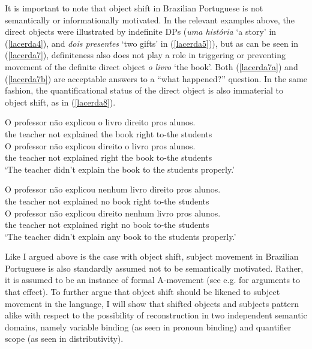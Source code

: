 \documentclass[output=paper]{langscibook}
\begin{document}
It is important to note that object shift in Brazilian Portuguese is not semantically or informationally motivated. In the relevant examples above, the direct objects were illustrated by indefinite DPs (\emph{uma história} ‘a story’ in (\ref{lacerda4}), and \emph{dois presentes} ‘two gifts’ in (\ref{lacerda5})), but as can be seen  in (\ref{lacerda7}), definiteness also does not play a role in triggering or preventing movement of the definite direct object \emph{o livro} ‘the book’. Both (\ref{lacerda7a}) and (\ref{lacerda7b}) are acceptable answers to a “what happened?” question. In the same fashion, the quantificational status of the direct object is also immaterial to object shift, as in (\ref{lacerda8}). 

\begin{exe}
\ex \label{lacerda7}
\begin{xlist}
\ex \label{lacerda7a}
\gll O	professor	não	explicou 	o 	livro 	direito 	pros 	alunos.\\
    the	teacher	not	explained	the	book	right	to-the	students\\

\ex \label{lacerda7b}
\gll O	professor 	não	explicou 	direito 	o	livro	pros	alunos.\\
    the	teacher	not	explained	right	the	book	to-the	students\\
\glt‘The teacher didn’t explain the book to the students properly.’\\

\end{xlist}

\ex \label{lacerda8}
\begin{xlist}
\ex \label{lacerda8a}
\gll O	professor	não	explicou 	nenhum	livro	direito 	pros 	alunos.\\
the	teacher	not	explained	no	book	right	to-the	students\\

\ex \label{lacerda8b}
\gll O	professor 	não	explicou 	direito 	nenhum	livro	pros	alunos.\\
    the	teacher	not	explained	right	no	book	to-the	students\\
\glt‘The teacher didn’t explain any book to the students properly.’

\end{xlist}
\end{exe}

Like I argued above is the case with object shift, subject movement in Brazilian Portuguese is also standardly assumed not to be semantically motivated. Rather, it is assumed to be an instance of formal A-movement (see e.g. \citealt{Nunes2010} for arguments to that effect). To further argue that object shift should be likened to subject movement in the language, I will show that shifted objects and subjects pattern alike with respect to the possibility of reconstruction in two independent semantic domains, namely variable binding (as seen in pronoun binding) and quantifier scope (as seen in distributivity).
\end{document}
